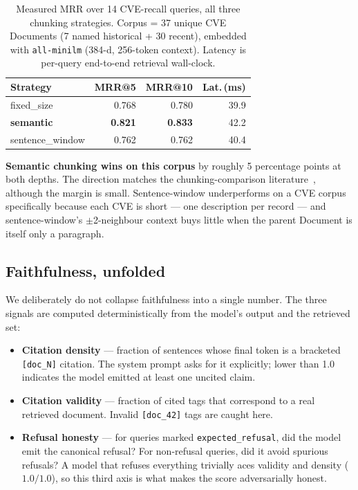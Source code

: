 \documentclass[conference]{IEEEtran}
\begin{document}
\begin{table}[t]
\centering
\caption{Measured MRR over 14 CVE-recall queries, all three chunking
strategies. Corpus = 37 unique CVE Documents (7 named historical +
30 recent), embedded with \texttt{all-minilm} (384-d, 256-token
context). Latency is per-query end-to-end retrieval wall-clock.}
\label{tab:mrr}
\renewcommand{\arraystretch}{1.18}
\begin{tabular}{lrrr}
\toprule
\textbf{Strategy} & \textbf{MRR@5} & \textbf{MRR@10} & \textbf{Lat.\,(ms)} \\
\midrule
fixed\_size       & 0.768 & 0.780 & 39.9 \\
\textbf{semantic} & \textbf{0.821} & \textbf{0.833} & 42.2 \\
sentence\_window  & 0.762 & 0.762 & 40.4 \\
\bottomrule
\end{tabular}
\end{table}

\textbf{Semantic chunking wins on this corpus} by roughly 5
percentage points at both depths. The direction matches the
chunking-comparison literature~\cite{iris2025chunking}, although the
margin is small. Sentence-window underperforms on a CVE corpus
specifically because each CVE is short --- one description per
record --- and sentence-window's $\pm$2-neighbour context buys
little when the parent Document is itself only a paragraph.

\subsection{Faithfulness, unfolded}
We deliberately do not collapse faithfulness into a single number.
The three signals are computed deterministically from the model's
output and the retrieved set:

\begin{itemize}
\item \textbf{Citation density} --- fraction of sentences whose
final token is a bracketed \texttt{[doc\_N]} citation. The system
prompt asks for it explicitly; lower than 1.0 indicates the model
emitted at least one uncited claim.
\item \textbf{Citation validity} --- fraction of cited tags that
correspond to a real retrieved document. Invalid \texttt{[doc\_42]}
tags are caught here.
\item \textbf{Refusal honesty} --- for queries marked
\texttt{expected\_refusal}, did the model emit the canonical
refusal? For non-refusal queries, did it avoid spurious refusals?
A model that refuses everything trivially aces validity and density
($1.0/1.0$), so this third axis is what makes the score
adversarially honest.
\end{itemize}
\end{document}
